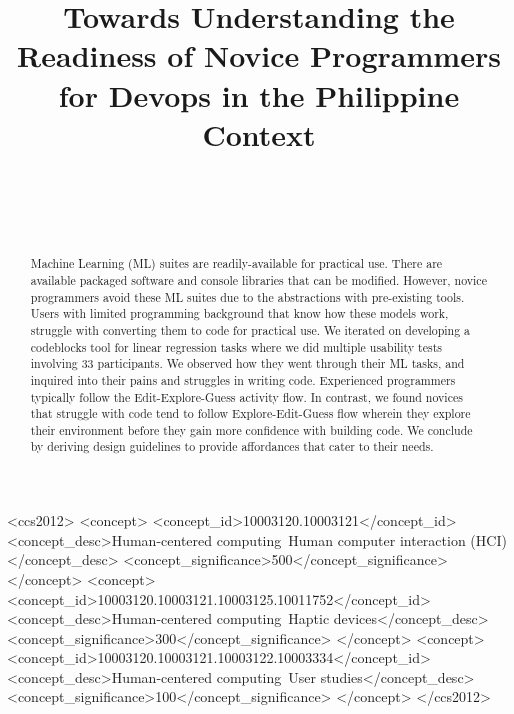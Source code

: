 \documentclass{sigchi}
\def\plaintitle{Towards Understanding the Readiness of Novice Programmers for Devops in the Philippine Context}
\begin{document}
\title{\plaintitle}

\author{%
  \\
  \\
  \\
}

\maketitle

\begin{abstract}
%  
Machine Learning (ML) suites are readily-available for practical use. There are available packaged software and console libraries that can be modified. However, novice programmers avoid these ML suites due to the abstractions with pre-existing tools. Users with limited programming background that know how these models work, struggle with converting them to code for practical use. We iterated on developing a codeblocks tool for linear regression tasks where we did multiple usability tests involving 33 participants. We observed how they went through their ML tasks, and inquired into their pains and struggles in writing code. Experienced programmers typically follow the Edit-Explore-Guess activity flow. In contrast, we found novices that struggle with code tend to follow Explore-Edit-Guess flow wherein they explore their environment before they gain more confidence with building code. We conclude by deriving design guidelines to provide affordances that cater to their needs.
\end{abstract}

\begin{CCSXML}
<ccs2012>
<concept>
<concept_id>10003120.10003121</concept_id>
<concept_desc>Human-centered computing~Human computer interaction (HCI)</concept_desc>
<concept_significance>500</concept_significance>
</concept>
<concept>
<concept_id>10003120.10003121.10003125.10011752</concept_id>
<concept_desc>Human-centered computing~Haptic devices</concept_desc>
<concept_significance>300</concept_significance>
</concept>
<concept>
<concept_id>10003120.10003121.10003122.10003334</concept_id>
<concept_desc>Human-centered computing~User studies</concept_desc>
<concept_significance>100</concept_significance>
</concept>
</ccs2012>
\end{CCSXML}
\end{document}
